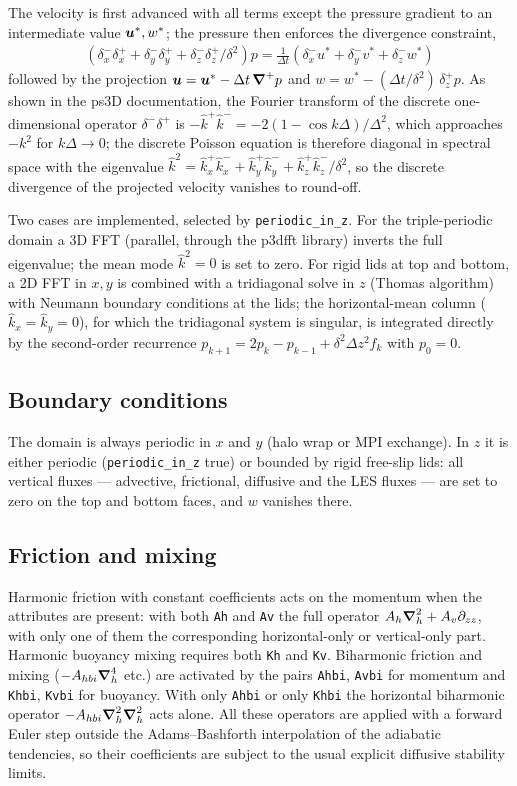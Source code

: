 \documentclass[12pt]{article}
\newcommand{\beq}  { \begin{eqnarray*} }
\newcommand{\eeq}  { \end{eqnarray*}}
\renewcommand{\v}[1]{{\mbox{\boldmath$ #1 $}}}  %
\newcommand{\p}{{\partial}}
\newcommand{\vn}{{\v \nabla}}
\newcommand{\lk}{\left(}
\newcommand{\rk}{\right)}
\begin{document}
The velocity is first advanced with all terms except the pressure gradient
to an intermediate value $\v u^*, w^*$; the pressure then enforces the
divergence constraint,
\beq
 \lk \delta_x^- \delta_x^+ + \delta_y^- \delta_y^+
   + \delta_z^- \delta_z^+/\delta^2 \rk p =
 \frac{1}{\Delta t} \lk \delta_x^- u^* + \delta_y^- v^* + \delta_z^- w^* \rk
\eeq
followed by the projection
$\v u = \v u^* - \Delta t\, \vn^+ p$ and
$w = w^* - (\Delta t/\delta^2)\, \delta_z^+ p$.
As shown in the ps3D documentation, the Fourier transform of the discrete
one-dimensional operator $\delta^-\delta^+$ is
$-\hat k^+ \hat k^- = -2\lk 1 - \cos k \Delta \rk/\Delta^2$, which
approaches $-k^2$ for $k \Delta \to 0$; the discrete Poisson equation is
therefore diagonal in spectral space with the eigenvalue
$\hat k^2 = \hat k_x^+ \hat k_x^- + \hat k_y^+ \hat k_y^-
+ \hat k_z^+ \hat k_z^-/\delta^2$,
so the discrete divergence of the projected velocity vanishes to round-off.

Two cases are implemented, selected by \verb|periodic_in_z|. For the
triple-periodic domain a 3D FFT (parallel, through the p3dfft library)
inverts the full eigenvalue; the mean mode $\hat k^2 = 0$ is set to zero.
For rigid lids at top and bottom, a 2D FFT in $x,y$ is combined with a
tridiagonal solve in $z$ (Thomas algorithm) with Neumann boundary
conditions at the lids; the horizontal-mean column
($\hat k_x = \hat k_y = 0$), for which the tridiagonal system is singular,
is integrated directly by the second-order recurrence
$p_{k+1} = 2 p_k - p_{k-1} + \delta^2 \Delta z^2 f_k$ with $p_0 = 0$.

\subsection*{Boundary conditions}

The domain is always periodic in $x$ and $y$ (halo wrap or MPI exchange).
In $z$ it is either periodic (\verb|periodic_in_z| true) or bounded by
rigid free-slip lids: all vertical fluxes --- advective, frictional,
diffusive and the LES fluxes --- are set to zero on the top and bottom
faces, and $w$ vanishes there.

\subsection*{Friction and mixing}

Harmonic friction with constant coefficients acts on the momentum when the
attributes are present: with both \verb|Ah| and \verb|Av| the full operator
$A_h \vn_h^2 + A_v \p_{zz}$, with only one of them the corresponding
horizontal-only or vertical-only part. Harmonic buoyancy mixing requires
both \verb|Kh| and \verb|Kv|. Biharmonic friction and mixing
($-A_{hbi}\vn_h^4$ etc.) are activated by the pairs \verb|Ahbi|,
\verb|Avbi| for momentum and \verb|Khbi|, \verb|Kvbi| for buoyancy.
With only \verb|Ahbi| or only \verb|Khbi| the horizontal biharmonic
operator $-A_{hbi} \vn_h^2 \vn_h^2$ acts alone. All
these operators are applied with a forward Euler step outside the
Adams--Bashforth interpolation of the adiabatic tendencies, so their
coefficients are subject to the usual explicit diffusive stability limits.
\end{document}

